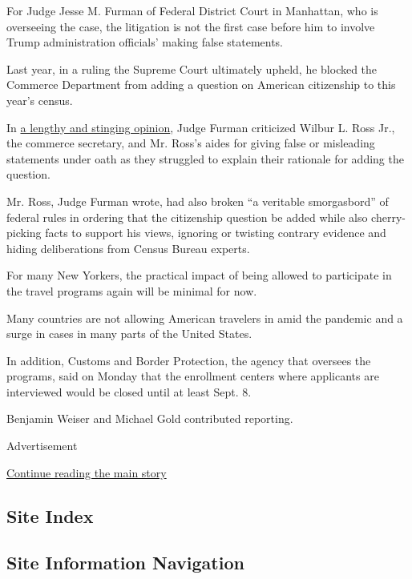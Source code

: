 For Judge Jesse M. Furman of Federal District Court in Manhattan, who is
overseeing the case, the litigation is not the first case before him to
involve Trump administration officials' making false statements.

Last year, in a ruling the Supreme Court ultimately upheld, he blocked
the Commerce Department from adding a question on American citizenship
to this year's census.

In
\href{https://www.brennancenter.org/sites/default/files/legal-work/2019-01-15-574-Findings\%20Of\%20Fact.pdf}{a
lengthy and stinging opinion}, Judge Furman criticized Wilbur L. Ross
Jr., the commerce secretary, and Mr. Ross's aides for giving false or
misleading statements under oath as they struggled to explain their
rationale for adding the question.

Mr. Ross, Judge Furman wrote, had also broken ``a veritable
smorgasbord'' of federal rules in ordering that the citizenship question
be added while also cherry-picking facts to support his views, ignoring
or twisting contrary evidence and hiding deliberations from Census
Bureau experts.

For many New Yorkers, the practical impact of being allowed to
participate in the travel programs again will be minimal for now.

Many countries are not allowing American travelers in amid the pandemic
and a surge in cases in many parts of the United States.

In addition, Customs and Border Protection, the agency that oversees the
programs, said on Monday that the enrollment centers where applicants
are interviewed would be closed until at least Sept. 8.

Benjamin Weiser and Michael Gold contributed reporting.

Advertisement

\protect\hyperlink{after-bottom}{Continue reading the main story}

\hypertarget{site-index}{%
\subsection{Site Index}\label{site-index}}

\hypertarget{site-information-navigation}{%
\subsection{Site Information
Navigation}\label{site-information-navigation}}

